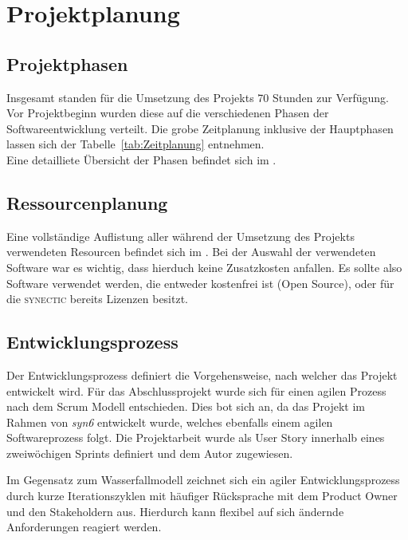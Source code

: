 \section{Projektplanung} 
\label{sec:Projektplanung}


\subsection{Projektphasen}
\label{sec:Projektphasen}

Insgesamt standen für die Umsetzung des Projekts 70 Stunden zur Verfügung. Vor Projektbeginn wurden diese auf die verschiedenen Phasen der Softwareentwicklung verteilt. Die grobe Zeitplanung inklusive der Hauptphasen lassen sich der Tabelle~\ref{tab:Zeitplanung} entnehmen. 
\\
Eine detailliete Übersicht der Phasen befindet sich im .


\subsection{Ressourcenplanung}
\label{sec:Ressourcenplanung}

Eine vollständige Auflistung aller während der Umsetzung des Projekts verwendeten Resourcen befindet sich im . Bei der Auswahl der verwendeten Software war es wichtig, dass hierduch keine Zusatzkosten anfallen. Es sollte also Software verwendet werden, die entweder kostenfrei ist (\zB Open Source), oder für die \textsc{synectic} bereits Lizenzen besitzt.


\subsection{Entwicklungsprozess}
\label{sec:Entwicklungsprozess}

Der Entwicklungsprozess definiert die Vorgehensweise, nach welcher das Projekt entwickelt wird. Für das Abschlussprojekt wurde sich für einen agilen Prozess nach dem Scrum Modell entschieden. Dies bot sich an, da das Projekt im Rahmen von \textit{syn6} entwickelt wurde, welches ebenfalls einem agilen Softwareprozess folgt. Die Projektarbeit wurde als User Story innerhalb eines zweiwöchigen Sprints definiert und dem Autor zugewiesen.

Im Gegensatz zum Wasserfallmodell zeichnet sich ein agiler Entwicklungsprozess durch kurze Iterationszyklen mit häufiger Rücksprache mit dem Product Owner und den Stakeholdern aus. Hierdurch kann flexibel auf sich ändernde Anforderungen reagiert werden.

